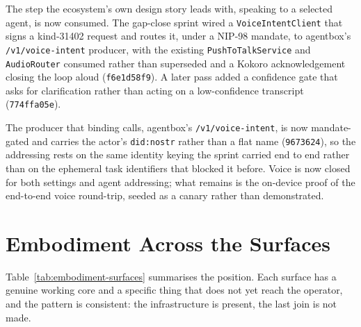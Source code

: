 The step the ecosystem's own design story leads with, speaking to a selected agent, is now consumed. The gap-close sprint wired a \texttt{VoiceIntentClient} that signs a kind-31402 request and routes it, under a NIP-98 mandate, to agentbox's \texttt{/v1/voice-intent} producer, with the existing \texttt{PushToTalkService} and \texttt{AudioRouter} consumed rather than superseded and a Kokoro acknowledgement closing the loop aloud (\texttt{f6e1d58f9}). A later pass added a confidence gate that asks for clarification rather than acting on a low-confidence transcript (\texttt{774ffa05e}).

The producer that binding calls, agentbox's \texttt{/v1/voice-intent}, is now mandate-gated and carries the actor's \texttt{did:nostr} rather than a flat name (\texttt{9673624}), so the addressing rests on the same identity keying the sprint carried end to end rather than on the ephemeral task identifiers that blocked it before. Voice is now closed for both settings and agent addressing; what remains is the on-device proof of the end-to-end voice round-trip, seeded as a canary rather than demonstrated.

\section{Embodiment Across the Surfaces}

Table~\ref{tab:embodiment-surfaces} summarises the position. Each surface has a genuine working core and a specific thing that does not yet reach the operator, and the pattern is consistent: the infrastructure is present, the last join is not made.

